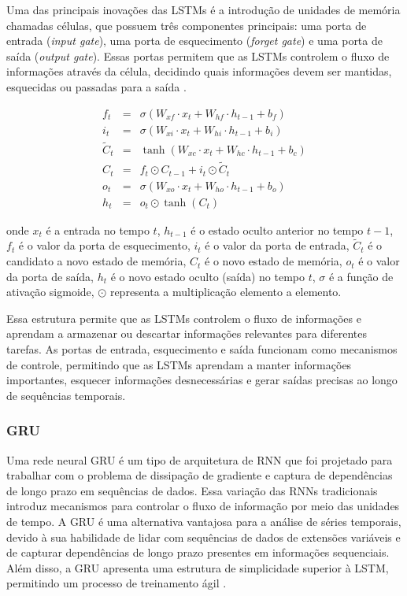  Uma das principais inovações das LSTMs é a introdução de unidades de memória chamadas células, que possuem três componentes principais: uma porta de entrada (\textit{input gate}), uma porta de esquecimento (\textit{forget gate}) e uma porta de saída (\textit{output gate}). Essas portas permitem que as LSTMs controlem o fluxo de informações através da célula, decidindo quais informações devem ser mantidas, esquecidas ou passadas para a saída \cite{Zhang2021}.
  
 \begin{eqnarray}
 	f_t &=& \sigma(W_{xf} \cdot x_t + W_{hf} \cdot h_{t-1} + b_f) \\
 	i_t &=& \sigma(W_{xi} \cdot x_t + W_{hi} \cdot h_{t-1} + b_i) \\
 	\tilde{C}_t &=& \tanh(W_{xc} \cdot x_t + W_{hc} \cdot h_{t-1} + b_c) \\
 	C_t &=& f_t \odot C_{t-1} + i_t \odot \tilde{C}_t \\
 	o_t &=& \sigma(W_{xo} \cdot x_t + W_{ho} \cdot h_{t-1} + b_o) \\
 	h_t &=& o_t \odot \tanh(C_t)
 \end{eqnarray}
 
\noindent onde \(x_t\) é a entrada no tempo \(t\), \(h_{t-1}\) é o estado oculto anterior no tempo \(t-1\), \(f_t\) é o valor da porta de esquecimento, \(i_t\) é o valor da porta de entrada, \(\tilde{C}_t\) é o candidato a novo estado de memória, \(C_t\) é o novo estado de memória, \(o_t\) é o valor da porta de saída, \(h_t\) é o novo estado oculto (saída) no tempo \(t\), \(\sigma\) é a função de ativação sigmoide, \(\odot\) representa a multiplicação elemento a elemento.
 
 Essa estrutura permite que as LSTMs controlem o fluxo de informações e aprendam a armazenar ou descartar informações relevantes para diferentes tarefas. As portas de entrada, esquecimento e saída funcionam como mecanismos de controle, permitindo que as LSTMs aprendam a manter informações importantes, esquecer informações desnecessárias e gerar saídas precisas ao longo de sequências temporais.
 
 \subsubsection{GRU}
 
Uma rede neural GRU é um tipo de arquitetura de RNN que foi projetado para trabalhar com o problema de dissipação de gradiente e captura de dependências de longo prazo em sequências de dados. Essa variação das RNNs tradicionais introduz mecanismos para controlar o fluxo de informação por meio das unidades de tempo.
A GRU é uma alternativa vantajosa para a análise de séries temporais, devido à sua habilidade de lidar com sequências de dados de extensões variáveis e de capturar dependências de longo prazo presentes em informações sequenciais. Além disso, a GRU apresenta uma estrutura de simplicidade superior à LSTM, permitindo um processo de treinamento ágil  \cite{mastersthesis53fd58a7}.
 
